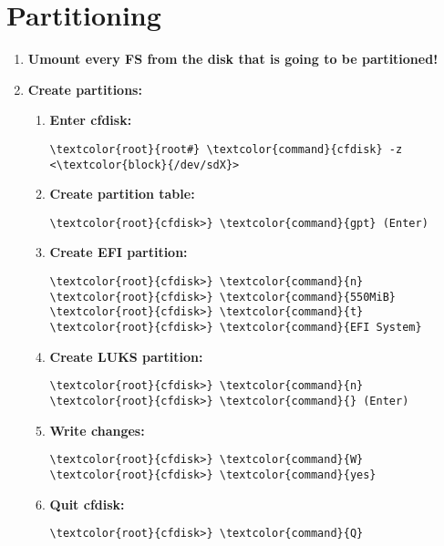 \documentclass[10pt, a4paper, onecolumn, oneside, titlepage, openany]{book}
\begin{document}
\section{Partitioning}
\begin{enumerate}
    \item \textbf{Umount every FS from the disk that is going to be partitioned!}
    \item \textbf{Create partitions:}
    \begin{enumerate}
        \item \textbf{Enter cfdisk:}
\begin{Verbatim}[commandchars=\\\{\}]
\textcolor{root}{root#} \textcolor{command}{cfdisk} -z <\textcolor{block}{/dev/sdX}>
\end{Verbatim}
        \item \textbf{Create partition table:}
\begin{Verbatim}[commandchars=\\\{\}]
\textcolor{root}{cfdisk>} \textcolor{command}{gpt} (Enter)
\end{Verbatim}
        \item \textbf{Create EFI partition:}
\begin{Verbatim}[commandchars=\\\{\}]
\textcolor{root}{cfdisk>} \textcolor{command}{n}
\textcolor{root}{cfdisk>} \textcolor{command}{550MiB}
\textcolor{root}{cfdisk>} \textcolor{command}{t}
\textcolor{root}{cfdisk>} \textcolor{command}{EFI System}
\end{Verbatim}
        \item \textbf{Create LUKS partition:}
\begin{Verbatim}[commandchars=\\\{\}]
\textcolor{root}{cfdisk>} \textcolor{command}{n}
\textcolor{root}{cfdisk>} \textcolor{command}{} (Enter)
\end{Verbatim}
        \item \textbf{Write changes:}
\begin{Verbatim}[commandchars=\\\{\}]
\textcolor{root}{cfdisk>} \textcolor{command}{W}
\textcolor{root}{cfdisk>} \textcolor{command}{yes}
\end{Verbatim}
        \item \textbf{Quit cfdisk:}
\begin{Verbatim}[commandchars=\\\{\}]
\textcolor{root}{cfdisk>} \textcolor{command}{Q}
\end{Verbatim}

\end{enumerate}
\end{enumerate}
\end{document}
